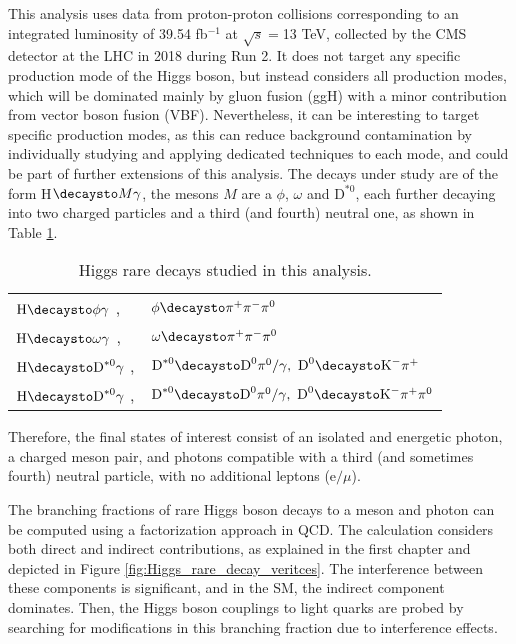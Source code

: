 This analysis uses data from proton-proton collisions corresponding to an integrated luminosity of 39.54 fb$^{-1}$ at $\sqrt{s}=$13 TeV, collected by the CMS detector at the LHC in 2018 during Run 2. It does not target any specific production mode of the Higgs boson, but instead considers all production modes, which will be dominated mainly by gluon fusion (ggH) with a minor contribution from vector boson fusion (VBF). Nevertheless, it can be interesting to target specific production modes, as this can reduce background contamination by individually studying and applying dedicated techniques to each mode, and could be part of further extensions of this analysis. The decays under study are of the form H$\decaysto M\gamma$, the mesons $M$ are a $\phi$, $\omega$ and $\text{D}^{*0}$, each further decaying into two charged particles and a third (and fourth) neutral one, as shown in Table \ref{tab:Higgs_rare_decays_three}.
\begin{table}[ht]
    \centering
    \begin{tabular}{ll}
        $\text{H}\decaysto \phi\gamma$ ,& $\phi\decaysto \pi^+\pi^-\pi^0$ \\
        $\text{H}\decaysto \omega\gamma$ ,& $\omega\decaysto \pi^+\pi^-\pi^0$\\
        $\text{H}\decaysto \text{D}^{*0}\gamma$ ,& $\text{D}^{*0}\decaysto \text{D}^{0}\pi^{0}/\gamma,\ \text{D}^{0}\decaysto \text{K}^{-}\pi^{+}$\\
        $\text{H}\decaysto \text{D}^{*0}\gamma$ ,& $\text{D}^{*0}\decaysto \text{D}^{0}\pi^{0}/\gamma,\ \text{D}^{0}\decaysto \text{K}^{-}\pi^{+}\pi^{0}$
    \end{tabular}
    \caption{Higgs rare decays studied in this analysis.}
    \label{tab:Higgs_rare_decays_three}
\end{table}

Therefore, the final states of interest consist of an isolated and energetic photon, a charged meson pair, and photons compatible with a third (and sometimes fourth) neutral particle, with no additional leptons (e$/\mu$). 

The branching fractions of rare Higgs boson decays to a meson and photon can be computed using a factorization approach in QCD. The calculation considers both direct and indirect contributions, as explained in the first chapter and depicted in Figure \ref{fig:Higgs_rare_decay_veritces}. The interference between these components is significant, and in the SM, the indirect component dominates. Then, the Higgs boson couplings to light quarks are probed by searching for modifications in this branching fraction due to interference effects.

